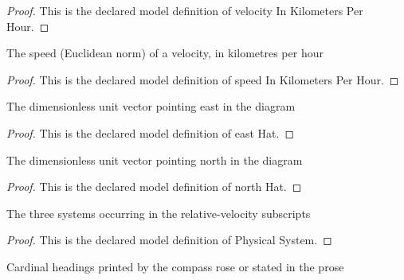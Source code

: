 \begin{proof}
  This is the declared model definition of velocity In Kilometers Per Hour.
\end{proof}
\begin{definition}
  \label{def:physics:phyx-mini-0797:phyxminiproblems-problemphyxmini0797-speedinkilometersperhour}
  The speed (Euclidean norm) of a velocity, in kilometres per hour
\end{definition}
\begin{proof}
  This is the declared model definition of speed In Kilometers Per Hour.
\end{proof}
\begin{definition}
  \label{def:physics:phyx-mini-0797:phyxminiproblems-problemphyxmini0797-easthat}
  The dimensionless unit vector pointing east in the diagram
\end{definition}
\begin{proof}
  This is the declared model definition of east Hat.
\end{proof}
\begin{definition}
  \label{def:physics:phyx-mini-0797:phyxminiproblems-problemphyxmini0797-northhat}
  The dimensionless unit vector pointing north in the diagram
\end{definition}
\begin{proof}
  This is the declared model definition of north Hat.
\end{proof}
\begin{definition}
  \label{def:physics:phyx-mini-0797:phyxminiproblems-problemphyxmini0797-physicalsystem}
  The three systems occurring in the relative-velocity subscripts
\end{definition}
\begin{proof}
  This is the declared model definition of Physical System.
\end{proof}
\begin{definition}
  \label{def:physics:phyx-mini-0797:phyxminiproblems-problemphyxmini0797-cardinaldirection}
  Cardinal headings printed by the compass rose or stated in the prose
\end{definition}
